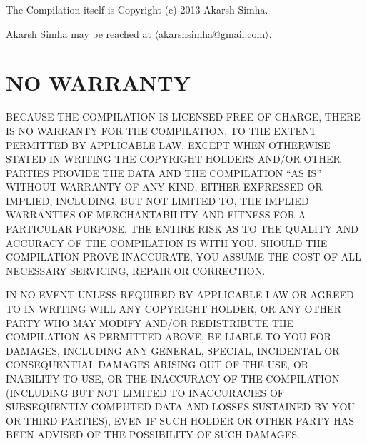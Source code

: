The Compilation itself is Copyright (c) 2013 Akarsh Simha.

Akarsh Simha may be reached at $\langle$akarshsimha@gmail.com$\rangle$.

\section{NO WARRANTY}

  BECAUSE THE COMPILATION IS LICENSED FREE OF CHARGE, THERE IS NO
  WARRANTY FOR THE COMPILATION, TO THE EXTENT PERMITTED BY APPLICABLE
  LAW.  EXCEPT WHEN OTHERWISE STATED IN WRITING THE COPYRIGHT HOLDERS
  AND/OR OTHER PARTIES PROVIDE THE DATA AND THE COMPILATION ``AS IS''
  WITHOUT WARRANTY OF ANY KIND, EITHER EXPRESSED OR IMPLIED,
  INCLUDING, BUT NOT LIMITED TO, THE IMPLIED WARRANTIES OF
  MERCHANTABILITY AND FITNESS FOR A PARTICULAR PURPOSE.  THE ENTIRE
  RISK AS TO THE QUALITY AND ACCURACY OF THE COMPILATION IS WITH YOU.
  SHOULD THE COMPILATION PROVE INACCURATE, YOU ASSUME THE COST OF ALL
  NECESSARY SERVICING, REPAIR OR CORRECTION.

  IN NO EVENT UNLESS REQUIRED BY APPLICABLE LAW OR AGREED TO IN
  WRITING WILL ANY COPYRIGHT HOLDER, OR ANY OTHER PARTY WHO MAY MODIFY
  AND/OR REDISTRIBUTE THE COMPILATION AS PERMITTED ABOVE, BE LIABLE TO
  YOU FOR DAMAGES, INCLUDING ANY GENERAL, SPECIAL, INCIDENTAL OR
  CONSEQUENTIAL DAMAGES ARISING OUT OF THE USE, OR INABILITY TO USE,
  OR THE INACCURACY OF THE COMPILATION (INCLUDING BUT NOT LIMITED TO
  INACCURACIES OF SUBSEQUENTLY COMPUTED DATA AND LOSSES SUSTAINED BY
  YOU OR THIRD PARTIES), EVEN IF SUCH HOLDER OR OTHER PARTY HAS BEEN
  ADVISED OF THE POSSIBILITY OF SUCH DAMAGES.
